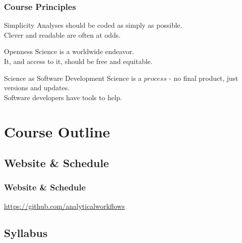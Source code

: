 \documentclass{beamer}
\begin{document}
\begin{frame}

    \frametitle{Course Principles}

        \begin{block}{Simplicity}
            Analyses should be coded as simply as possible.\\Clever and readable are often at odds.
        \end{block}

        \begin{block}{Openness}
            Science is a worldwide endeavor.\\It, and access to it, should be free and equitable.
        \end{block}

        \begin{block}{Science as Software Development}
            Science is a $process$ - no final product, just versions and updates.\\Software developers have tools to help.
        \end{block}


\end{frame}

\section{Course Outline}


\subsection{Website \& Schedule}

\begin{frame}
    \frametitle{Website \& Schedule}
    \url{https://github.com/analyticalworkflows}

\end{frame}


\subsection{Syllabus}

\end{document}

